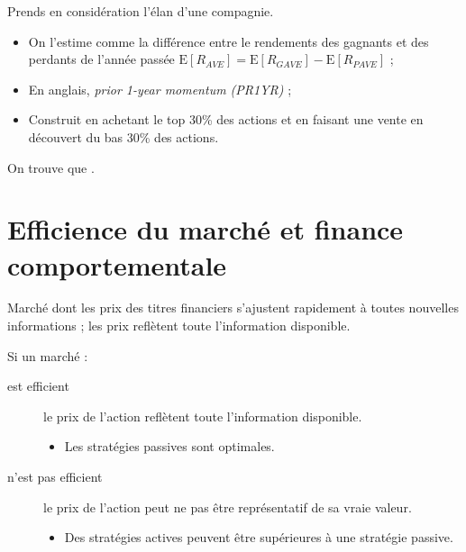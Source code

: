 \documentclass[10pt, french]{article}
\begin{document}
\begin{multicols*}{2}
\begin{definitionNOHFILLsub}
Prends en considération l'élan d'une compagnie.	\\

\begin{itemize}
	\item	On l'estime comme la différence entre le rendements des gagnants et des perdants de l'année passée $\text{E}[R_{AVE}]	=	\text{E}[R_{GAVE}]	-	\text{E}[R_{PAVE}]$ ;
	\item	En anglais, \og \textit{prior 1-year momentum (PR1YR)} \fg{} ;
	\item	Construit en achetant le top 30\% des actions et en faisant une vente en découvert du bas 30\% des actions.
\end{itemize}
\end{definitionNOHFILLsub}

On trouve que 	.



\newpage
\setcounter{section}{38} %
\section{Efficience du marché et finance comportementale}
\begin{definitionNOHFILL}
Marché dont les prix des titres financiers s'ajustent rapidement à toutes nouvelles informations ; les prix reflètent toute l'information disponible.


Si un marché :
\begin{description}
	\item[est efficient]	le prix de l'action reflètent toute l'information disponible.
		\begin{itemize}
		\item	Les stratégies passives sont optimales.
		\end{itemize}
	\item[n'est pas efficient]	le prix de l'action peut ne pas être représentatif de sa vraie valeur.
		\begin{itemize}
		\item	Des stratégies actives peuvent être supérieures à une stratégie passive.
		\end{itemize}
\end{description}


\end{definitionNOHFILL}
\end{multicols*}
\end{document}
